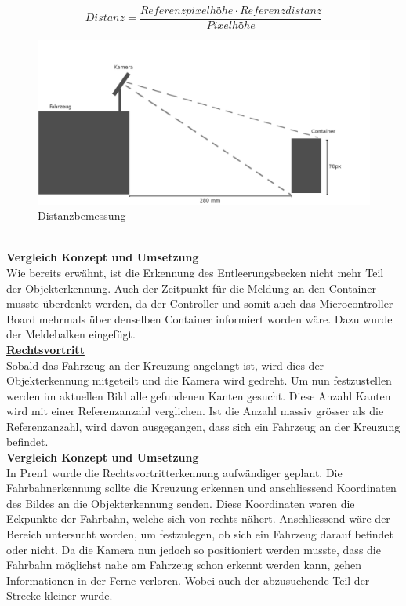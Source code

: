 \[
Distanz = \frac{Referenzpixelhöhe\cdot Referenzdistanz}{Pixelhöhe}
\]
\begin{figure}[H]%
\centering
\includegraphics[width=1\textwidth]{03_Loesungskonzept/pictures/distance_reference.png}
\caption{Distanzbemessung}
\label{fig:distanceCalculation}
\end{figure}
\\[0.2cm]
\textbf{Vergleich Konzept und Umsetzung}\\[0.2cm]
Wie bereits erwähnt, ist die Erkennung des Entleerungsbecken nicht mehr Teil der Objekterkennung. Auch der Zeitpunkt für die Meldung an den Container musste überdenkt werden, da der Controller und somit auch das Microcontroller-Board mehrmals über denselben Container informiert worden wäre. Dazu wurde der Meldebalken eingefügt.
\\[0.2cm]
\underline{\textbf{Rechtsvortritt}}\\[0.2cm]
Sobald das Fahrzeug an der Kreuzung angelangt ist, wird dies der Objekterkennung mitgeteilt und die Kamera wird gedreht. Um nun festzustellen werden im aktuellen Bild alle gefundenen Kanten gesucht. Diese Anzahl Kanten wird mit einer Referenzanzahl verglichen. Ist die Anzahl massiv grösser als die Referenzanzahl, wird davon ausgegangen, dass sich ein Fahrzeug an der Kreuzung befindet.\\[0.2cm]
\textbf{Vergleich Konzept und Umsetzung}\\[0.2cm]
In Pren1 wurde die Rechtsvortritterkennung aufwändiger geplant. Die Fahrbahnerkennung sollte die Kreuzung erkennen und anschliessend Koordinaten des Bildes an die Objekterkennung senden. Diese Koordinaten waren die Eckpunkte der Fahrbahn, welche sich von rechts nähert. Anschliessend wäre der Bereich untersucht worden, um festzulegen, ob sich ein Fahrzeug darauf befindet oder nicht. Da die Kamera nun jedoch so positioniert werden musste, dass die Fahrbahn möglichst nahe am Fahrzeug schon erkennt werden kann, gehen Informationen in der Ferne verloren. Wobei auch der abzusuchende Teil der Strecke kleiner wurde.
\newpage
